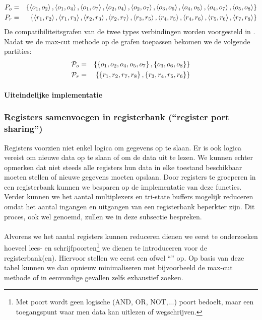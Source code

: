 \begin{eqnarray}
P_o&=&\left\{ \left\langle o_1,o_2 \right\rangle,\left\langle o_1,o_4 \right\rangle,\left\langle o_1,o_7 \right\rangle,\left\langle o_2,o_4 \right\rangle,\left\langle o_2,o_7 \right\rangle,\left\langle o_3,o_6 \right\rangle,\left\langle o_4,o_5 \right\rangle,\left\langle o_4,o_7 \right\rangle,\left\langle o_5,o_8 \right\rangle \right\}\\
P_r&=&\left\{ \left\langle r_1,r_2 \right\rangle,\left\langle r_1,r_3 \right\rangle,\left\langle r_2,r_3 \right\rangle,\left\langle r_2,r_7 \right\rangle,\left\langle r_3,r_5 \right\rangle,\left\langle r_4,r_5 \right\rangle,\left\langle r_4,r_6 \right\rangle,\left\langle r_5,r_6 \right\rangle,\left\langle r_7,r_8 \right\rangle \right\}
\end{eqnarray}
De compatibiliteitsgrafen van de twee types verbindingen worden voorgesteld in . Nadat we de max-cut methode op de grafen toepassen bekomen we de volgende partities:
\begin{eqnarray}
\mathcal{P}_o&=&\left\{ \left\{ o_1,o_2,o_4,o_5,o_7 \right\},\left\{ o_3,o_6,o_8 \right\} \right\}\\
\mathcal{P}_r&=&\left\{ \left\{ r_1,r_2,r_7,r_8 \right\},\left\{ r_3,r_4,r_5,r_6 \right\} \right\}
\end{eqnarray}
\paragraph{Uiteindelijke implementatie}
\subsubsection{Registers samenvoegen in registerbank (``register port sharing'')}
Registers voorzien niet enkel logica om gegevens op te slaan. Er is ook logica vereist om nieuwe data op te slaan of om de data uit te lezen. We kunnen echter opmerken dat niet steeds alle registers hun data in elke toestand beschikbaar moeten stellen of nieuwe gegevens moeten opslaan. Door registers te groeperen in een registerbank kunnen we besparen op de implementatie van deze functies. Verder kunnen we het aantal multiplexers en tri-state buffers mogelijk reduceren omdat het aantal ingangen en uitgangen van een registerbank beperkter zijn. Dit proces, ook wel  genoemd, zullen we in deze subsectie bespreken.
\paragraph{}
Alvorens we het aantal registers kunnen reduceren dienen we eerst te onderzoeken hoeveel lees- en schrijfpoorten\footnote{Met poort wordt geen logische (AND, OR, NOT,...) poort bedoelt, maar een toegangspunt waar men data kan uitlezen of wegschrijven.} we dienen te introduceren voor de registerbank(en). Hiervoor stellen we eerst een  ofwel ``'' op. Op basis van deze tabel kunnen we dan opnieuw minimaliseren met bijvoorbeeld de max-cut methode of in eenvoudige gevallen zelfs exhaustief zoeken.
